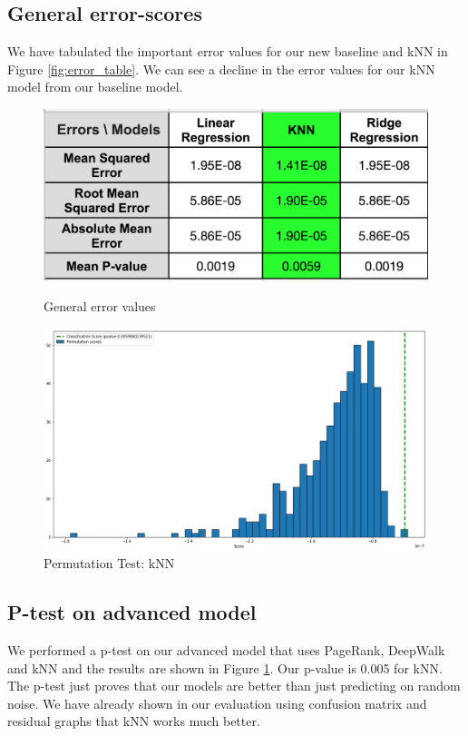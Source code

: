 \documentclass[a4paper, 11pt]{article}
\begin{document}
\subsection{General error-scores}

We have tabulated the important error values for our new baseline and kNN in Figure \ref{fig:error_table}. We can see a decline in the error values for our kNN model from our baseline model.

\begin{figure}[!htb] 
%
  \includegraphics[width=\linewidth]{error_table.png}
   \caption{General error values}
     \label{fig:error_table}
\endminipage\hfill
{}%
  \includegraphics[width=\linewidth]{ptest_knn.png}
   \caption{Permutation Test: kNN}
  \label{fig:ptest_knn}
\endminipage\hfill
\end{figure}

\subsection{P-test on advanced model}

We performed a p-test on our advanced model that uses PageRank, DeepWalk and kNN and the results are shown in Figure \ref{fig:ptest_knn}. Our p-value is 0.005 for kNN.  The p-test just proves that our models are better than just predicting on random noise. We have already shown in our evaluation using confusion matrix and residual graphs that kNN works much better.
\end{document}
